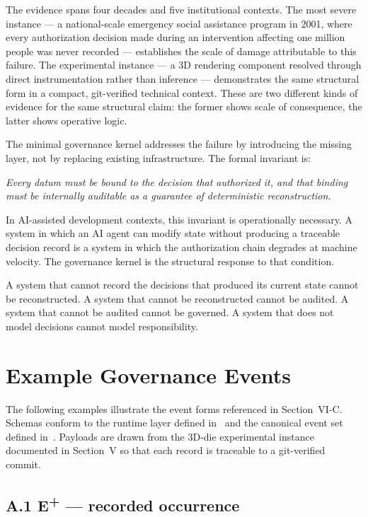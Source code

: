 \documentclass[conference]{IEEEtran}
\begin{document}
The evidence spans four decades and five institutional contexts. The most severe instance --- a national-scale emergency social assistance program in 2001, where every authorization decision made during an intervention affecting one million people was never recorded --- establishes the scale of damage attributable to this failure. The experimental instance --- a 3D rendering component resolved through direct instrumentation rather than inference --- demonstrates the same structural form in a compact, git-verified technical context. These are two different kinds of evidence for the same structural claim: the former shows scale of consequence, the latter shows operative logic.

The minimal governance kernel addresses the failure by introducing the missing layer, not by replacing existing infrastructure. The formal invariant is:

\medskip
\noindent\emph{Every datum must be bound to the decision that authorized it, and that binding must be internally auditable as a guarantee of deterministic reconstruction.}

\medskip
In AI-assisted development contexts, this invariant is operationally necessary. A system in which an AI agent can modify state without producing a traceable decision record is a system in which the authorization chain degrades at machine velocity. The governance kernel is the structural response to that condition.

A system that cannot record the decisions that produced its current state cannot be reconstructed. A system that cannot be reconstructed cannot be audited. A system that cannot be audited cannot be governed. A system that does not model decisions cannot model responsibility.

\appendices
\section{Example Governance Events}
\label{app:events}

The following examples illustrate the event forms referenced in Section~VI-C. Schemas conform to the runtime layer defined in~\cite{sanchez_framework} and the canonical event set defined in~\cite{sanchez_core}. Payloads are drawn from the 3D-die experimental instance documented in Section~V so that each record is traceable to a git-verified commit.

\subsection*{A.1 E\textsuperscript{+} --- recorded occurrence}
\end{document}
